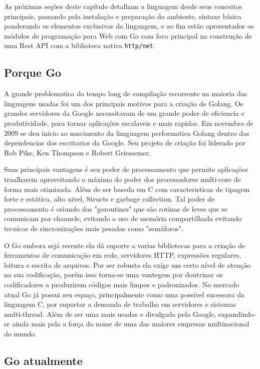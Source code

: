 \documentclass{SBCbookchapter}
\begin{document}
As próximas seções deste capítulo detalham a linguagem desde seus conceitos principais, passando pela instalação e preparação do ambiente, sintaxe básica ponderando os elementos exclusivos da linguagem, e ao fim estão apresentados os módulos de programação para Web com Go com foco principal na construção de uma Rest API com a biblioteca nativa \texttt{http/net}.

\subsection{Porque Go}

A grande problematica do tempo long de compilação recorrente na maioria das linguagens usadas foi um dos principais motivos para a criação de Golang. Os grandes servidores da Google necessitavam de um grande poder de eficiencia e produtividade, para tornar aplicações escalaveis e mais rapidas. Em novembro de 2009 se deu inicio ao nascimento da limguagem performatica Golang dentro das dependencias dos escritorios da Google. Seu projeto de criação foi liderado por Rob Pike, Ken Thompson e Robert Griessemer.

Suas principais vantagens é seu poder de processamento que permite aplicações traalharem aproveitando o máximo do poder dos processadores multi-core de forma mais otimizada. Além de ser baseda em C com caracteristicas de tipagem forte e estática, alto nivel, Structs e garbage collection. Tal poder de processamento é oriundo das "goroutines" que são rotinas de leves que se comunicam por channels, evitando o uso de memória compartilhada evitando tecnicas de sincronizações mais pesadas como "semáforos".


O Go embora sejá recente ela dá suporte a varias bibliotecas para a criação de ferramentas de comunicação em rede, servidores HTTP, expressões regulares, leitura e escrita de arquivos. Por ser robusta ela exige um certo nível de atenção na sua codificação, porém isso torna-se uma vantegem por doutrinar os codificadores a produzirem códigos mais limpos e padronizados. No mercado atual Go já possui seu espaço, principalmente como uma possível sucessora da linguagem C, por suportar a demanda de trabalho em servidores e sistemas multi-thread. Além de ser uma mais usadas e divulgada pela Google, expandindo-se ainda mais pela a força do nome de uma das maiores empresas multinacional do mundo. 

\subsection{Go atualmente}
\end{document}
